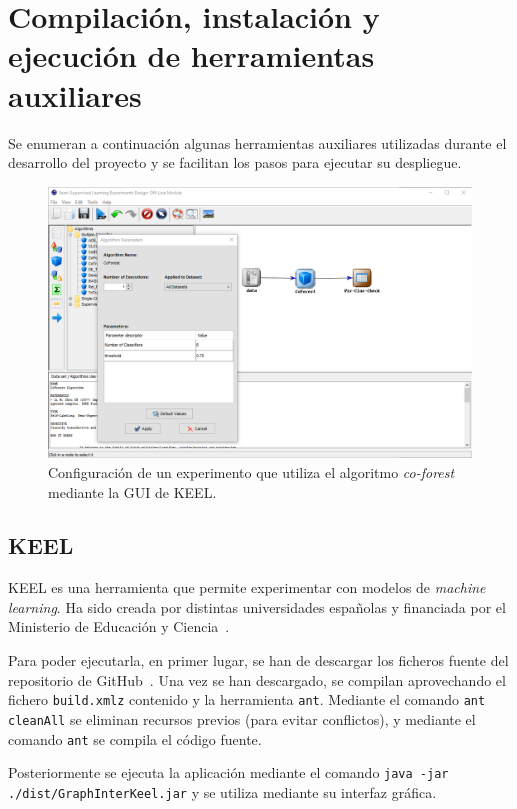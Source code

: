 \section{Compilación, instalación y ejecución de herramientas auxiliares}
\label{ds:inst-aux}

Se enumeran a continuación algunas herramientas auxiliares utilizadas durante el desarrollo del proyecto y se facilitan los pasos para ejecutar su despliegue.
\begin{figure}[h]
	\caption[Herramientas auxiliares: experimento en KEEL]{Configuración de un experimento que utiliza el algoritmo \textit{co-forest} mediante la GUI de KEEL.}
	\centering
	\includegraphics[scale=0.5]{../img/anexos/manual/keel_gui.png}
\end{figure}

\subsection{KEEL}

KEEL es una herramienta que permite experimentar con modelos de \textit{machine learning}. Ha sido creada por distintas universidades españolas y financiada por el Ministerio de Educación y Ciencia~\cite{KEEL}.

Para poder ejecutarla, en primer lugar, se han de descargar los ficheros fuente del repositorio de GitHub~\cite{keelRepo}. Una vez se han descargado, se compilan aprovechando el fichero \texttt{build.xmlz} contenido y la herramienta \texttt{ant}. Mediante el comando \texttt{ant cleanAll} se eliminan recursos previos (para evitar conflictos), y mediante el comando \texttt{ant} se compila el código fuente.

Posteriormente se ejecuta la aplicación mediante el comando \texttt{java -jar ./dist/GraphInterKeel.jar} y se utiliza mediante su interfaz gráfica.


